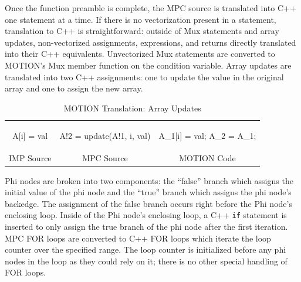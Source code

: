 Once the function preamble is complete, the MPC source is translated into C++ one statement at a time.  If there is no vectorization present in a statement, translation to C++ is straightforward: outside of Mux statements and array updates, non-vectorized assignments, expressions, and returns directly translated into their C++ equivalents.  Unvectorized Mux statements are converted to MOTION's Mux member function on the condition variable.  Array updates are translated into two C++ assignments: one to update the value in the original array and one to assign the new array.

\begin{table}
\begin{tabular}{ccc}
\begin{minipage}{0.33\textwidth}
{\small
\begin{pythonn}
A[i] = val
\end{pythonn}
}
\end{minipage}

&

\begin{minipage}{0.33\textwidth}
{\small
\begin{pythonn}
A!2 = update(A!1, i, val)
\end{pythonn}
}
\end{minipage}

&

\begin{minipage}{0.33\textwidth}
{\small
\begin{cppp}
A_1[i] = val;
A_2 = A_1;
\end{cppp}
}
\end{minipage}

\\

IMP Source & MPC Source & MOTION Code
\end{tabular}
\caption{MOTION Translation: Array Updates}
\label{tab:motion_translation_array_updates}
\end{table}

Phi nodes are broken into two components: the ``false'' branch which assigns the initial value of the phi node and the ``true'' branch which assigns the phi node's backedge.  The assignment of the false branch occurs right before the Phi node's enclosing loop.  Inside of the Phi node's enclosing loop, a C++ \texttt{if} statement is inserted to only assign the true branch of the phi node after the first iteration.  MPC FOR loops are converted to C++ FOR loops which iterate the loop counter over the specified range.  The loop counter is initialized before any phi nodes in the loop as they could rely on it; there is no other special handling of FOR loops.

